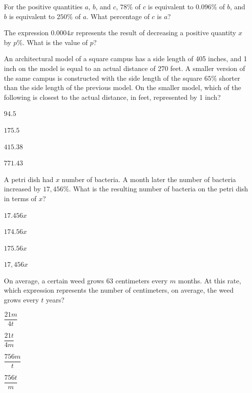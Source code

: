 \vfill
\noindent\begin{minipage}{\linewidth}
\par\smallskip
For the positive quantities $a$, $b$, and $c$, $78\%$ of $c$ is equivalent to $0.096\%$ of $b$, and $b$ is equivalent to $250\%$ of $a$. What percentage of $c$ is $a$?
\end{minipage}
\vfill
\noindent\begin{minipage}{\linewidth}
\par\smallskip
The expression $0.0004x$ represents the result of decreasing a positive quantity $x$ by $p\%$. What is the value of $p$?
\end{minipage}
\vfill
\clearpage
\noindent\begin{minipage}{\linewidth}
\par\smallskip
An architectural model of a square campus has a side length of 405 inches, and 1 inch on the model is equal to an actual distance of 270 feet. A smaller version of the same campus is constructed with the side length of the square $65\%$ shorter than the side length of the previous model. On the smaller model, which of the following is closest to the actual distance, in feet, represented by 1 inch?
\begin{satchoices}
  \item[A)] $94.5$
  \item[B)] $175.5$
  \item[C)] $415.38$
  \item[D)] $771.43$
\end{satchoices}
\end{minipage}
\vfill
\noindent\begin{minipage}{\linewidth}
\par\smallskip
A petri dish had $x$ number of bacteria. A month later the number of bacteria increased by $17{,}456\%$. What is the resulting number of bacteria on the petri dish in terms of $x$?
\begin{satchoices}
  \item[A)] $17.456x$
  \item[B)] $174.56x$
  \item[C)] $175.56x$
  \item[D)] $17{,}456x$
\end{satchoices}
\end{minipage}
\vfill
\noindent\begin{minipage}{\linewidth}
\par\smallskip
On average, a certain weed grows 63 centimeters every $m$ months. At this rate, which expression represents the number of centimeters, on average, the weed grows every $t$ years?
\begin{satchoices}
  \item[A)] $\dfrac{21m}{4t}$
  \item[B)] $\dfrac{21t}{4m}$
  \item[C)] $\dfrac{756m}{t}$
  \item[D)] $\dfrac{756t}{m}$
\end{satchoices}
\end{minipage}
